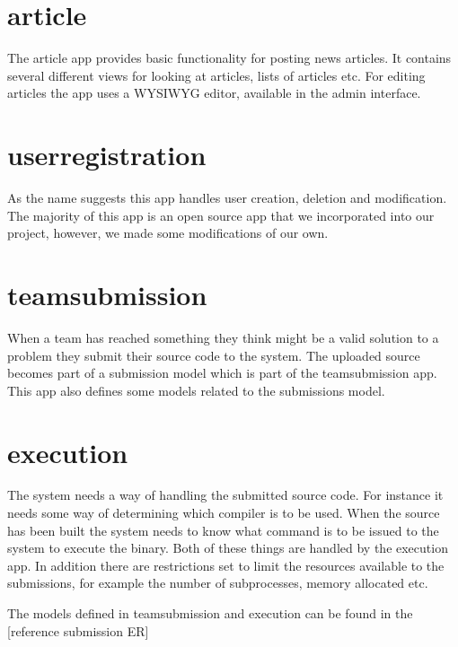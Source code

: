 \bigskip

\section{article}
The article app provides basic functionality for posting news articles.
It contains several different views for looking at articles, lists of
articles etc. For editing articles the app uses a WYSIWYG editor,
available in the admin interface. 

\section{userregistration}
As the name suggests this app handles user creation, deletion and
modification. The majority of this app is an open source app that we
incorporated into our project, however, we made some
modifications of our own. 

\section{teamsubmission}
When a team has reached something they think might be a valid solution
to a problem they submit their source code to the system. The uploaded
source becomes part of a submission model which is part of the
teamsubmission app. This app also defines some models related to the submissions model.

\section{execution}
The system needs a way of handling the submitted source code. For
instance it needs some way of determining which compiler is to be used.
When the source has been built the system needs to know what command is
to be issued to the system to execute the binary. Both of these things
are handled by the execution app. In addition there are restrictions
set to limit the resources available to the submissions, for example
the number of subprocesses, memory allocated etc.


\bigskip

The models defined in teamsubmission and execution can be found in the
[reference submission ER]


